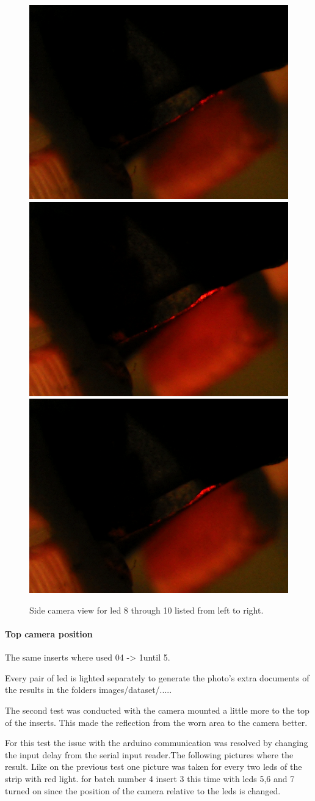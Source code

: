 \begin{figure}
\includegraphics[width=.3\textwidth, keepaspectratio=true]{./fig/Vision/Dataset/automated_datasets/1_check_camera_position/1_camera_position_side/p3_l8.png}\hfill
\includegraphics[width=.3\textwidth, keepaspectratio=true]{./fig/Vision/Dataset/automated_datasets/1_check_camera_position/1_camera_position_side/p3_l9.png}\hfill
\includegraphics[width=.3\textwidth, keepaspectratio=true]{./fig/Vision/Dataset/automated_datasets/1_check_camera_position/1_camera_position_side/p3_l10.png}
\caption{Side camera view for led 8 through 10 listed from left to right.}
\label{fig:dataset:cameraposition:side:results}
\end{figure}

		\paragraph{Top camera position}

The same inserts where used 04 -\textgreater{} 1until 5. 

Every pair of led is lighted separately to generate the photo's 
extra documents of the results in the folders images/dataset/.....

The second test was conducted with the camera mounted a little more to the top of the inserts. This made the reflection from the worn area to the camera better. 

For this test the issue with the arduino communication was resolved by changing the input delay from the serial input reader.The following pictures where the result. 
Like on the previous test one picture was taken for every two leds of the strip with red light. for batch number 4 insert 3 this time with leds 5,6 and 7 turned on since the position of the camera relative to the leds is changed.

